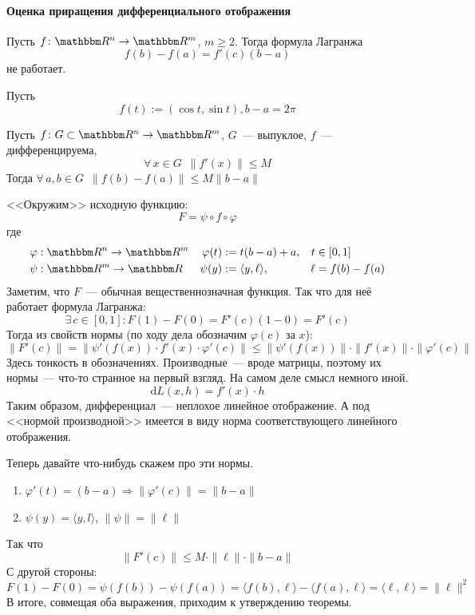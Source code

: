 \documentclass[12pt,trimbord]{../../../notes}
\begin{document}
\paragraph{Оценка приращения дифференциального отображения}
\label{par:diffspace::diffestim}

\begin{prop}\label{prop:diffspace::diffestim::lagrfail}
  Пусть $f\colon \R^n \to \R^m$, $m \geqslant 2$. Тогда формула Лагранжа
  \[
    f(b) - f(a) = f'(c)(b - a)
  \]
  не работает.
\end{prop}
\begin{exmp*}\label{exmp:diffspace::diffestim::lagrfail}
  Пусть 
  \[
    f(t) := (\cos t, \sin t), b - a = 2\pi
  \]
\end{exmp*}

\begin{thrm}\label{thrm:diffspace::diffestim::diffestim}
  Пусть $f\colon G \subset \R^n \to \R^m$, $G$~--- выпуклое, $f$~--- дифференцируема, 
  \[ 
    \forall\, x \in G \;\: \| f'(x) \| \leqslant M 
  \]
  Тогда $\forall\, a,b \in G \;\: \|f(b) - f(a)\| \leqslant M \| b-a \|$
\end{thrm}

\begin{ittproof}
  <<Окружим>>  исходную функцию:
  \[
    F = \psi \circ f \circ \varphi
  \]
  где 
  \begin{align*}
    \varphi&: \R^n \to \R^m & \varphi(t) &:= t(b-a) + a, & t&\in [0,1] \\
    \psi&: \R^m \to \R & \psi(y) &:= \langle y, \ell \rangle, & \ell &= f(b)-f(a) 
  \end{align*}
  Заметим, что $F$~--- обычная вещественнозначная функция. Так что для неё работает формула
  Лагранжа:
  \[
    \exists\, c \in [0,1] \colon F(1)-F(0) = F'(c)(1-0) = F'(c)
  \]
  Тогда из свойств нормы (по ходу дела обозначим $\varphi(c)$ за $x$):
  \[
    \|F'(c)\| = \|\psi'(f(x)) \cdot f'(x) \cdot \varphi'(c)\| \leqslant 
    \|\psi'(f(x)) \| \cdot \| f'(x) \| \cdot \| \varphi'(c)\|
  \]
  Здесь тонкость в обозначениях. Производные~--- вроде матрицы, поэтому их нормы~--- что-то
  странное на первый взгляд. На самом деле смысл немного иной. 
  \[
    \mathrm d L(x, h) = f'(x) \cdot h
  \]
  Таким образом, дифференциал~--- неплохое линейное отображение. А под <<нормой производной>>
  имеется в виду норма соответствующего линейного отображения.

  Теперь давайте что-нибудь скажем про эти нормы. 
  \begin{enumerate}
    \item $\varphi'(t) = (b-a) \Rightarrow \| \varphi'(c) \| = \| b - a\|$
    \item $\psi(y) = \langle y, l \rangle$, $\| \psi\| = \|\ell\|$      
  \end{enumerate}
  Так что 
  \[
    \| F'(c)\| \leqslant M \cdot \| \ell \| \cdot \|b-a\|
  \]
  С другой стороны:
  \[
    F(1) - F(0) = \psi(f(b)) - \psi(f(a)) = \langle f(b), \ell \rangle - \langle f(a), \ell \rangle
    = \langle \ell, \ell \rangle  = \|\ell \|^2
  \]
  В итоге, совмещая оба выражения, приходим к утверждению теоремы.
\end{ittproof}
\end{document}
